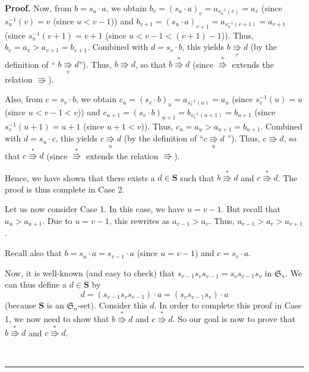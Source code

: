 \documentclass[numbers=enddot,12pt,final,onecolumn,notitlepage]{scrartcl}%
\theoremstyle{definition}
\newenvironment{proof}[1][Proof]{\noindent\textbf{#1.} }{\ \rule{0.5em}{0.5em}}
\newenvironment{verlong}{}{}
\begin{document}
\begin{proof}
\begin{verlong}
Now, from $b=s_{u}\cdot a$, we obtain $b_{v}=\left(  s_{u}\cdot a\right)
_{v}=a_{s_{u}^{-1}\left(  v\right)  }=a_{v}$ (since $s_{u}^{-1}\left(
v\right)  =v$ (since $u<v-1$)) and $b_{v+1}=\left(  s_{u}\cdot a\right)
_{v+1}=a_{s_{u}^{-1}\left(  v+1\right)  }=a_{v+1}$ (since $s_{u}^{-1}\left(
v+1\right)  =v+1$ (since $u<v-1<\left(  v+1\right)  -1$)). Thus, $b_{v}%
=a_{v}>a_{v+1}=b_{v+1}$. Combined with $d=s_{v}\cdot b$, this yields
$b\underset{v}{\Rrightarrow}d$ (by the definition of \textquotedblleft%
$b\underset{v}{\Rrightarrow}d$\textquotedblright). Thus, $b\Rrightarrow d$, so
that $b\overset{\ast}{\Rrightarrow}d$ (since $\overset{\ast}{\Rrightarrow}$
extends the relation $\Rrightarrow$).

Also, from $c=s_{v}\cdot b$, we obtain $c_{u}=\left(  s_{v}\cdot b\right)
_{u}=a_{s_{v}^{-1}\left(  u\right)  }=a_{u}$ (since $s_{v}^{-1}\left(
u\right)  =u$ (since $u<v-1<v$)) and $c_{u+1}=\left(  s_{v}\cdot b\right)
_{u+1}=b_{s_{v}^{-1}\left(  u+1\right)  }=b_{u+1}$ (since $s_{v}^{-1}\left(
u+1\right)  =u+1$ (since $u+1<v$)). Thus, $c_{u}=a_{u}>a_{u+1}=b_{u+1}$.
Combined with $d=s_{u}\cdot c$, this yields $c\underset{u}{\Rrightarrow}d$ (by
the definition of \textquotedblleft$c\underset{u}{\Rrightarrow}d$%
\textquotedblright). Thus, $c\Rrightarrow d$, so that $c\overset{\ast
}{\Rrightarrow}d$ (since $\overset{\ast}{\Rrightarrow}$ extends the relation
$\Rrightarrow$).

Hence, we have shown that there exists a $d\in\mathbf{S}$ such that
$b\overset{\ast}{\Rrightarrow}d$ and $c\overset{\ast}{\Rrightarrow}d$. The
proof is thus complete in Case 2.

Let us now consider Case 1. In this case, we have $u=v-1$. But recall that
$a_{u}>a_{u+1}$. Due to $u=v-1$, this rewrites as $a_{v-1}>a_{v}$. Thus,
$a_{v-1}>a_{v}>a_{v+1}$.

Recall also that $b=s_{u}\cdot a=s_{v-1}\cdot a$ (since $u=v-1$) and
$c=s_{v}\cdot a$.

Now, it is well-known (and easy to check) that $s_{v-1}s_{v}s_{v-1}%
=s_{v}s_{v-1}s_{v}$ in $\mathfrak{S}_{n}$. We can thus define a $d\in
\mathbf{S}$ by%
\[
d=\left(  s_{v-1}s_{v}s_{v-1}\right)  \cdot a=\left(  s_{v}s_{v-1}%
s_{v}\right)  \cdot a
\]
(because $\mathbf{S}$ is an $\mathfrak{S}_{n}$-set). Consider this $d$. In
order to complete this proof in Case 1, we now need to show that
$b\overset{\ast}{\Rrightarrow}d$ and $c\overset{\ast}{\Rrightarrow}d$. So our
goal is now to prove that $b\overset{\ast}{\Rrightarrow}d$ and $c\overset{\ast
}{\Rrightarrow}d$.


\end{verlong}
\end{proof}
\end{document}
